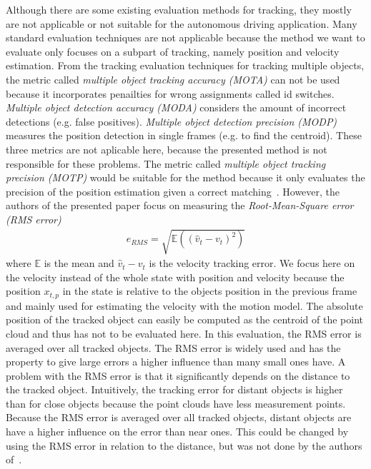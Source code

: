 \documentclass[twoside,a4paper,article]{combine}
\begin{document}
Although there are some existing evaluation methods for tracking, they
mostly are not applicable or not suitable for the autonomous driving
application. Many standard evaluation techniques are not applicable
because the method we want to evaluate only focuses on a subpart of
tracking, namely position and velocity estimation. From the tracking
evaluation techniques for tracking multiple objects, the metric called
\textit{multiple object tracking accuracy (MOTA)} can not be used
because it incorporates penailties for wrong assignments called id
switches. \textit{Multiple object detection accuracy (MODA)} considers
the amount of incorrect detections (e.g. false
positives). \textit{Multiple object detection precision (MODP)}
measures the position detection in single frames (e.g. to find the
centroid). These three metrics are not aplicable here, because the
presented method is not responsible for these problems. The metric
called \textit{multiple object tracking precision (MOTP)} would be
suitable for the method because it only evaluates the precision of the
position estimation given a correct matching~\cite{mot,mot2}. However,
the authors of the presented paper focus on measuring the
\textit{Root-Mean-Square error (RMS error)}
\begin{align}
  e_{RMS}=\sqrt{\mathbb{E}((\hat{v}_t-v_t)^2)}
\end{align}
where $\mathbb{E}$ is the mean and $\hat{v}_t-v_t$ is the velocity
tracking error. We focus here on the velocity instead of the whole
state with position and velocity because the position $x_{t,p}$ in the
state is relative to the objects position in the previous frame and
mainly used for estimating the velocity with the motion model. The
absolute position of the tracked object can easily be computed as the
centroid of the point cloud and thus has not to be evaluated here. In
this evaluation, the RMS error is averaged over all tracked objects. The
RMS error is widely used and has the property to give large errors a
higher influence than many small ones have. A problem with the RMS
error is that it significantly depends on the distance to the tracked 
object. Intuitively, the
tracking error for distant objects is higher than for close
objects because the point clouds have less measurement
points. Because the RMS error is averaged over all tracked objects,
distant objects are have a higher influence on the error than near
ones. This could be changed by using the RMS error in relation to the
distance, but was not done by the authors of~\cite{paper}.
\end{document}
